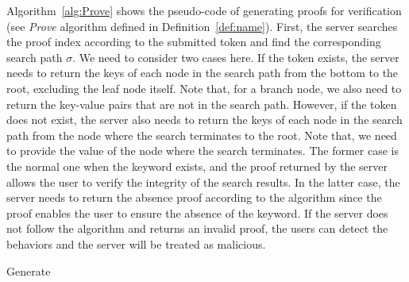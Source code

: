 Algorithm~\ref{alg:Prove} shows the pseudo-code of generating proofs for verification (see {\it Prove} algorithm defined in Definition~\ref{def:name}). First, the server searches the proof index according to the submitted token and find the corresponding search path $\sigma$. We need to consider two cases here. If the token exists, the server needs to return the keys of each node in the search path from the bottom to the root, excluding the leaf node itself. Note that, for a branch node, we also need to return the key-value pairs that are not in the search path. However, if the token does not exist, the server also needs to return the keys of each node in the search path from the node where the search terminates to the root. Note that, we need to provide the value of the node where the search terminates. The former case is the normal one when the keyword exists, and the proof returned by the server allows the user to verify the integrity of the search results. In the latter case, the server needs to return the absence proof according to the algorithm since the proof enables the user to ensure the absence of the keyword. If the server does not follow the algorithm and returns an invalid proof, the users can detect the behaviors and the server will be treated as malicious.
\begin{algorithm}[t]
  \caption{Generate}
  \label{alg:generate}
  \begin{algorithmic}[1]
          \ELSE
          \ENDIF
          \ELSE
          \ENDIF
  \end{algorithmic}
\end{algorithm}

